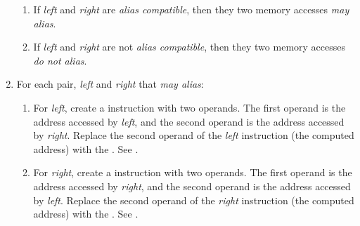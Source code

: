 \begin{enumerate}
\begin{enumerate}
    \item If \emph{left} and \emph{right} are \emph{alias compatible},
      then they two memory accesses \emph{may alias}.

    \item If \emph{left} and \emph{right} are not \emph{alias
      compatible}, then they two memory accesses \emph{do not alias}.
  \end{enumerate}

  \item For each pair, \emph{left} and \emph{right} that \emph{may
    alias}:
    \begin{enumerate}
      \item For \emph{left}, create a  instruction
        with two operands.  The first operand is the address
        accessed by \emph{left}, and the second operand is the address
        accessed by \emph{right}.  Replace the second operand of the
        \emph{left} instruction (the computed address) with the
        .  See .

      \item For \emph{right}, create a  instruction
        with two operands.  The first operand is the address accessed
        by \emph{right}, and the second operand is the address
        accessed by \emph{left}.  Replace the second operand of the
        \emph{right} instruction (the computed address) with the
        .  See .

    \end{enumerate}
\end{enumerate}
